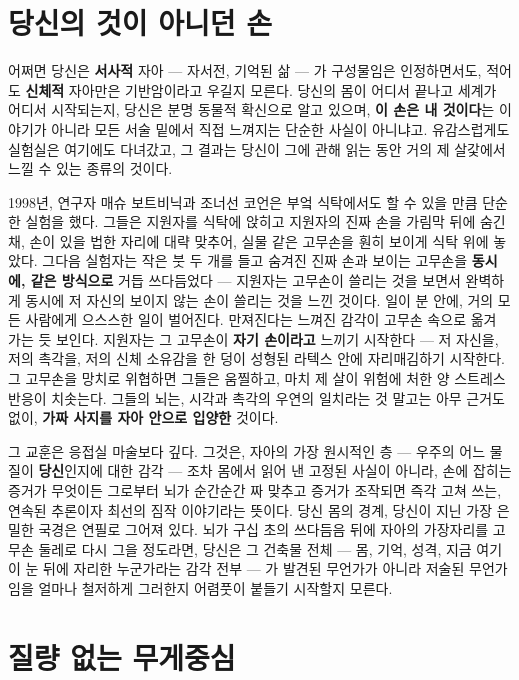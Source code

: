 \section*{당신의 것이 아니던 손}

어쩌면 당신은 \textbf{서사적} 자아 — 자서전, 기억된 삶 — 가 구성물임은 인정하면서도, 적어도 \textbf{신체적} 자아만은 기반암이라고 우길지 모른다. 당신의 몸이 어디서 끝나고 세계가 어디서 시작되는지, 당신은 분명 동물적 확신으로 알고 있으며, \textbf{이 손은 내 것이다}는 이야기가 아니라 모든 서술 밑에서 직접 느껴지는 단순한 사실이 아니냐고. 유감스럽게도 실험실은 여기에도 다녀갔고, 그 결과는 당신이 그에 관해 읽는 동안 거의 제 살갗에서 느낄 수 있는 종류의 것이다.

1998년, 연구자 매슈 보트비닉과 조너선 코언은 부엌 식탁에서도 할 수 있을 만큼 단순한 실험을 했다. 그들은 지원자를 식탁에 앉히고 지원자의 진짜 손을 가림막 뒤에 숨긴 채, 손이 있을 법한 자리에 대략 맞추어, 실물 같은 고무손을 훤히 보이게 식탁 위에 놓았다. 그다음 실험자는 작은 붓 두 개를 들고 숨겨진 진짜 손과 보이는 고무손을 \textbf{동시에, 같은 방식으로} 거듭 쓰다듬었다 — 지원자는 고무손이 쓸리는 것을 보면서 완벽하게 동시에 저 자신의 보이지 않는 손이 쓸리는 것을 느낀 것이다. 일이 분 안에, 거의 모든 사람에게 으스스한 일이 벌어진다. 만져진다는 느껴진 감각이 고무손 속으로 옮겨 가는 듯 보인다. 지원자는 그 고무손이 \textbf{자기 손이라고} 느끼기 시작한다 — 저 자신을, 저의 촉각을, 저의 신체 소유감을 한 덩이 성형된 라텍스 안에 자리매김하기 시작한다. 그 고무손을 망치로 위협하면 그들은 움찔하고, 마치 제 살이 위험에 처한 양 스트레스 반응이 치솟는다. 그들의 뇌는, 시각과 촉각의 우연의 일치라는 것 말고는 아무 근거도 없이, \textbf{가짜 사지를 자아 안으로 입양한} 것이다.

그 교훈은 응접실 마술보다 깊다. 그것은, 자아의 가장 원시적인 층 — 우주의 어느 물질이 \textbf{당신}인지에 대한 감각 — 조차 몸에서 읽어 낸 고정된 사실이 아니라, 손에 잡히는 증거가 무엇이든 그로부터 뇌가 순간순간 짜 맞추고 증거가 조작되면 즉각 고쳐 쓰는, 연속된 추론이자 최선의 짐작 이야기라는 뜻이다. 당신 몸의 경계, 당신이 지닌 가장 은밀한 국경은 연필로 그어져 있다. 뇌가 구십 초의 쓰다듬음 뒤에 자아의 가장자리를 고무손 둘레로 다시 그을 정도라면, 당신은 그 건축물 전체 — 몸, 기억, 성격, 지금 여기 이 눈 뒤에 자리한 누군가라는 감각 전부 — 가 발견된 무언가가 아니라 저술된 무언가임을 얼마나 철저하게 그러한지 어렴풋이 붙들기 시작할지 모른다.

\section*{질량 없는 무게중심}

